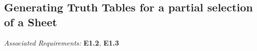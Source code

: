 

\subsection{Generating Truth Tables for a partial selection of a Sheet}
\emph{Associated Requirements:} \textbf{E1.2}, \textbf{E1.3}


